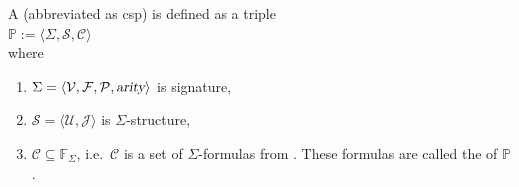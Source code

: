 \begin{Definition}[CSP]  \hspace*{\fill} \linebreak
A   (abbreviated as
\Gls{csp}) is defined as a triple
\\[0.2cm]
\hspace*{1.3cm}
$\mathbb{P} := \langle \Sigma, \mathcal{S}, \mathcal{C} \rangle$
\\[0.2cm]
where
\begin{enumerate}
\item $\Sigma = \langle \mathcal{V}, \mathcal{F}, \mathcal{P}, \textsl{arity} \rangle$ is signature,
\item $\mathcal{S} = \langle \mathcal{U}, \mathcal{J} \rangle$ is $\Sigma$-structure,
\item $\mathcal{C} \subseteq \mathbb{F}_\Sigma$, i.e.~$\mathcal{C}$ is a set of $\Sigma$-formulas from
      .  These formulas are called the  of $\mathbb{P}$.  \eox
\end{enumerate}
\end{Definition}
\vspace*{-0.3cm}

